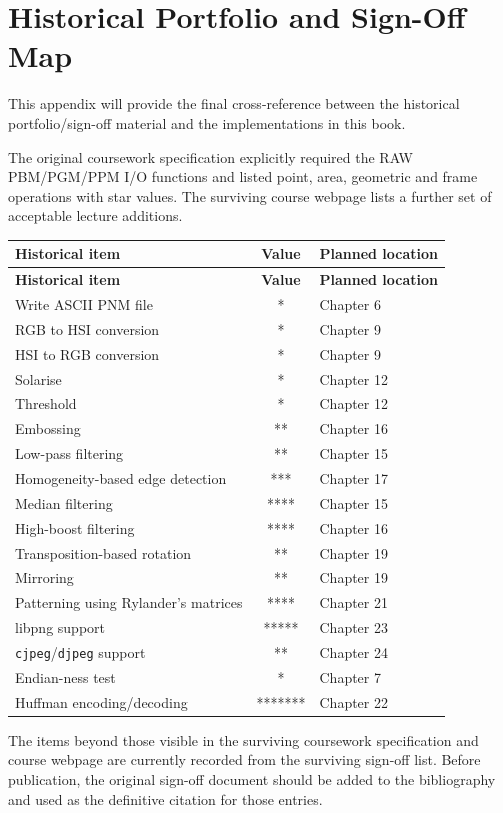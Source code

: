 \chapter{Historical Portfolio and Sign-Off Map}
\label{app:signoff}

This appendix will provide the final cross-reference between the historical
portfolio/sign-off material and the implementations in this book.

The original coursework specification explicitly required the RAW PBM/PGM/PPM
I/O functions and listed point, area, geometric and frame operations with star
values\cite{johnson_uqc146_assignment}. The surviving course webpage lists a
further set of acceptable lecture additions\cite{johnson_uqc146_web}.

\begin{longtable}{@{}p{}cp{}@{}}
\toprule
\textbf{Historical item} & \textbf{Value} & \textbf{Planned location} \\
\midrule
\endfirsthead
\toprule
\textbf{Historical item} & \textbf{Value} & \textbf{Planned location} \\
\midrule
\endhead
Write ASCII PNM file & * & Chapter 6 \\
RGB to HSI conversion & * & Chapter 9 \\
HSI to RGB conversion & * & Chapter 9 \\
Solarise & * & Chapter 12 \\
Threshold & * & Chapter 12 \\
Embossing & ** & Chapter 16 \\
Low-pass filtering & ** & Chapter 15 \\
Homogeneity-based edge detection & *** & Chapter 17 \\
Median filtering & **** & Chapter 15 \\
High-boost filtering & **** & Chapter 16 \\
Transposition-based rotation & ** & Chapter 19 \\
Mirroring & ** & Chapter 19 \\
Patterning using Rylander’s matrices & **** & Chapter 21 \\
libpng support & ***** & Chapter 23 \\
\texttt{cjpeg}/\texttt{djpeg} support & ** & Chapter 24 \\
Endian-ness test & * & Chapter 7 \\
Huffman encoding/decoding & ******* & Chapter 22 \\
\bottomrule
\end{longtable}

\begin{implementationnote}
The items beyond those visible in the surviving coursework specification and
course webpage are currently recorded from the surviving sign-off list. Before
publication, the original sign-off document should be added to the bibliography
and used as the definitive citation for those entries.
\end{implementationnote}
